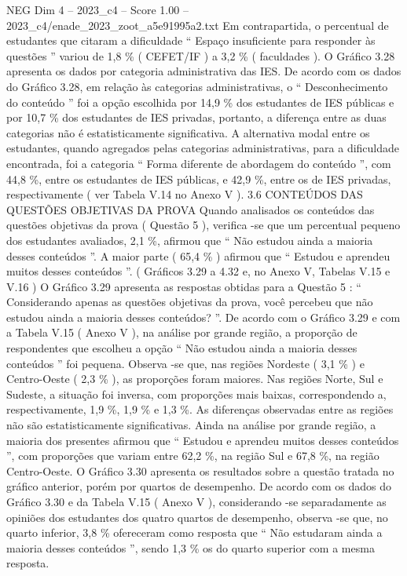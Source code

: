 \begin{textsample}{NEG Dim 4 – 2023\_c4 – Score 1.00 – 2023\_c4/enade\_2023\_zoot\_a5e91995a2.txt}
Em contrapartida, o percentual de estudantes que citaram a dificuldade “ Espaço insuficiente para responder às questões ” variou de 1,8 \% ( CEFET/IF ) a 3,2 \% ( faculdades ).
O Gráfico 3.28 apresenta os dados por categoria administrativa das IES.
De acordo com os dados do Gráfico 3.28, em relação às categorias administrativas, o “ Desconhecimento do conteúdo ” foi a opção escolhida por 14,9 \% dos estudantes de IES públicas e por 10,7 \% dos estudantes de IES privadas, portanto, a diferença entre as duas categorias não é estatisticamente significativa.
A alternativa modal entre os estudantes, quando agregados pelas categorias administrativas, para a dificuldade encontrada, foi a categoria “ Forma diferente de abordagem do conteúdo ”, com 44,8 \%, entre os estudantes de IES públicas, e 42,9 \%, entre os de IES privadas, respectivamente ( ver Tabela V.14 no Anexo V ). 3.6 CONTEÚDOS DAS QUESTÕES OBJETIVAS DA PROVA Quando analisados os conteúdos das questões objetivas da prova ( Questão 5 ), verifica -se que um percentual pequeno dos estudantes avaliados, 2,1 \%, afirmou que “ Não estudou ainda a maioria desses conteúdos ”.
A maior parte ( 65,4 \% ) afirmou que “ Estudou e aprendeu muitos desses conteúdos ”. ( Gráficos 3.29 a 4.32 e, no Anexo V, Tabelas V.15 e V.16 ) O Gráfico 3.29 apresenta as respostas obtidas para a Questão 5 : “ Considerando apenas as questões objetivas da prova, você percebeu que não estudou ainda a maioria desses conteúdos? ”.
De acordo com o Gráfico 3.29 e com a Tabela V.15 ( Anexo V ), na análise por grande região, a proporção de respondentes que escolheu a opção “ Não estudou ainda a maioria desses conteúdos ” foi pequena.
Observa -se que, nas regiões Nordeste ( 3,1 \% ) e Centro-Oeste ( 2,3 \% ), as proporções foram maiores.
Nas regiões Norte, Sul e Sudeste, a situação foi inversa, com proporções mais baixas, correspondendo a, respectivamente, 1,9 \%, 1,9 \% e 1,3 \%.
As diferenças observadas entre as regiões não são estatisticamente significativas.
Ainda na análise por grande região, a maioria dos presentes afirmou que “ Estudou e aprendeu muitos desses conteúdos ”, com proporções que variam entre 62,2 \%, na região Sul e 67,8 \%, na região Centro-Oeste.
O Gráfico 3.30 apresenta os resultados sobre a questão tratada no gráfico anterior, porém por quartos de desempenho.
De acordo com os dados do Gráfico 3.30 e da Tabela V.15 ( Anexo V ), considerando -se separadamente as opiniões dos estudantes dos quatro quartos de desempenho, observa -se que, no quarto inferior, 3,8 \% ofereceram como resposta que “ Não estudaram ainda a maioria desses conteúdos ”, sendo 1,3 \% os do quarto superior com a mesma resposta.

\end{textsample}
